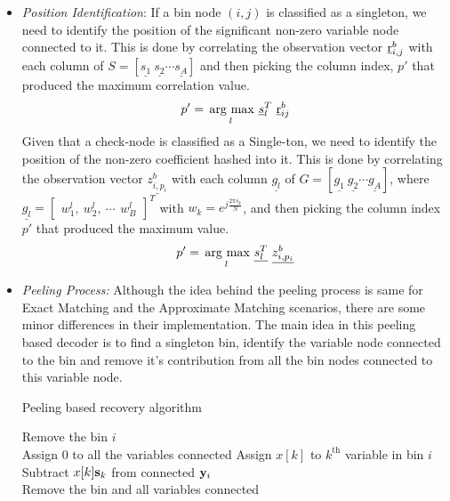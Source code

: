 \begin{enumerate}
\begin{itemize}
\item \textit{Position Identification}: If a bin node $(i,j)$ is classified as a singleton, we need to identify the position of the significant non-zero variable node connected to it. This is done by correlating the observation vector $\underline{\mathrm{r}}^{b}_{i,j}$ with each column of $S = [\underline{s_1} \ \underline{s_2} \cdots \underline{s_A}]$ and then picking the column index, $p'$ that produced the maximum correlation value.
\begin{align*}
 p' = \underset{l}{\operatorname*{\,arg\ max}}\  \underline{s}^T_l ~ \underline{\mathrm{r}}^{b}_{ij}
\end{align*} 
Given that a check-node is classified as a Single-ton, we need to identify the position of the non-zero coefficient  hashed into it. This is done by correlating the observation vector $\underline{z^{b}_{i,p_i}}$ with each column $\underline{g_l}$ of  $G = [\underline{g_1} \ \underline{g_2} \cdots \underline{g_A}]$, where $\underline{g_l} =\begin{bmatrix}
			 w_1^{l}, ~ w_2^{l}, ~ \cdots\, ~ w_B^{l}
			 \end{bmatrix}^{T}$ with $w_k = e^{j \frac{2\pi s_k}{N}}$,  and then picking the column index  $p'$ that produced the maximum value.
\[ p' = \underset{l}{\operatorname*{\,arg\ max}}\  \underline{s^T_l} ~ \underline{z^{b}_{i,p_i}}\]
			 
			 \item \textit{Peeling Process: } Although the idea behind the peeling process is same for Exact Matching and the Approximate Matching scenarios, there are some minor differences in their implementation. The main idea in this peeling based decoder is to find a singleton bin, identify the variable node connected to the bin and remove it's contribution from all the bin nodes connected to this variable node.\\

\begin{algorithm}
\caption{Peeling based recovery algorithm}
\label{Algo:decoder}
\begin{algorithmic}
    \State Remove the bin $i$\\
   \hspace{2ex} Assign $0$ to all the variables connected
   \hspace{4ex} Assign $x[k]$ to $k^{\text{th}}$ variable in bin $i$\\
  \hspace{2ex} Subtract $x[k]\mathbf{s}_k$ from connected $\mathbf{y}_i$  \\
  \hspace{2ex} Remove the bin and all variables connected
\EndIf
\EndWhile
\end{algorithmic}
\end{algorithm}



\end{itemize}
\end{enumerate}
